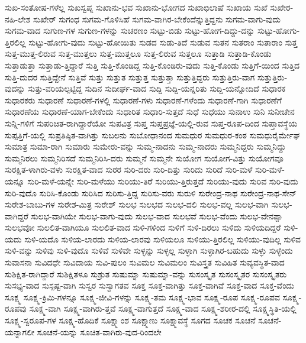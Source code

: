{ಸುಖ-ಸಂತೋಷ-ಗಳೆಲ್ಲ
ಸುಖಸ್ವಪ್ನ
ಸುಖಾನು-ಭವ
ಸುಖಾನು-ಭೋಗದ
ಸುಖಾಭಿಲಾಷೆ
ಸುಖಾಯ
ಸುಖೆ
ಸುಖೇರ-ನಹಿ-ಲೇಶ
ಸುಖೇರ್
ಸುಗಂಧ
ಸುಗಮ-ಗೊಳಿಸಿಹೆ
ಸುಗಮ-ವಾಗಿರ-ಬೇಕೆಂದೆನ್ನುತ್ತಿದ್ದನು
ಸುಗಮ-ವಾಗು-ವುದು
ಸುಗಮ-ವಾದ
ಸುಗುಣ-ಗಳ
ಸುಗುಣ-ಗಳನ್ನು
ಸುಚರಣಂ
ಸುಟ್ಟು-ಬಿಡು
ಸುಟ್ಟು-ಹೋಗ-ದಿದ್ದು-ದನ್ನು
ಸುಟ್ಟು-ಹೋಗು-ತ್ತಿರಲಿಲ್ಲ
ಸುಟ್ಟು-ಹೋಗು-ವುದು
ಸುಟ್ಟು-ಹೋಯಿತು
ಸುಡದ
ಸುಡು-ತಿದೆ
ಸುಡುವ
ಸುತನ
ಸುತರಾಂ
ಸುತಾರಾಂ
ಸುತ್ತ
ಸುತ್ತ-ಮುತ್ತ-ಲಿರುವ
ಸುತ್ತ-ಮುತ್ತಲು
ಸುತ್ತ-ಮುತ್ತಲೂ
ಸುತ್ತ-ಲಿರುವ
ಸುತ್ತಲೂ
ಸುತ್ತಾಡಿ
ಸುತ್ತಾಡಿ-ಕೊಂಡು
ಸುತ್ತಾಡುತ್ತಾ
ಸುತ್ತಾಡು-ತ್ತಿದ್ದಾರೆ
ಸುತ್ತಿ
ಸುತ್ತಿ-ಕೊಂಡಿದ್ದ
ಸುತ್ತಿ-ಕೊಂಡಿರು-ವುದು
ಸುತ್ತಿ-ಕೊಂಡು
ಸುತ್ತಿಗೆ-ಯಿಂದ
ಸುತ್ತಿದ
ಸುತ್ತಿ-ದುದರ
ಸುತ್ತಿದ್ದೇನೆ
ಸುತ್ತಿವೆ
ಸುತ್ತು
ಸುತ್ತುತ
ಸುತ್ತುತ್ತ
ಸುತ್ತುತ್ತಾ
ಸುತ್ತುತ್ತಿದ್ದರು
ಸುತ್ತುತ್ತಿರು-ವಾಗ
ಸುತ್ತುತ್ತಿರು-ವುದನ್ನು
ಸುತ್ತು-ವರಿಯಲ್ಪಟ್ಟಿದ್ದ
ಸುದಿನ
ಸುದೀರ್ಘ-ವಾದ
ಸುದ್ದಿ
ಸುದ್ದಿ-ಯನ್ನರಿತು
ಸುದ್ದಿ-ಯನ್ನೋದಿದೆ
ಸುಧಾರಕ
ಸುಧಾರಕರು
ಸುಧಾರಣೆ
ಸುಧಾರಣೆ-ಗಳಲ್ಲಿ
ಸುಧಾರಣೆ-ಗಳು
ಸುಧಾರಣೆ-ಗಳೆಂದು
ಸುಧಾರಣೆ-ಗಾಗಿ
ಸುಧಾರಣೆಗೆ
ಸುಧಾರಣೆಯ
ಸುಧಾರಣೆ-ಯಾಗ-ಬೇಕೆಂದು
ಸುಧಾರಿತ
ಸುಧಾರಿ-ಸುತ್ತದೆ
ಸುಧೆ
ಸುಧೆಯು
ಸುನಾಉ
ಸುನಿ
ಸುನೀಚೇನ
ಸುನ್ನಿ-ಗಳಿಗೆ
ಸುಪರಿಚಿತ-ರಾಗಿದ್ದಾರೆಯೋ
ಸುಪವಿತ್ರ
ಸುಪ್ತ
ಸುಪ್ತಪ್ರಜ್ಞೆ-ಯಲ್ಲಿ-ರುವ
ಸುಪ್ತ-ರೂಪ-ದಿಂದ
ಸುಪ್ತಾವಸ್ಥೆಯ
ಸುಪ್ಪತ್ತಿಗೆ-ಯಲ್ಲಿ
ಸುಪ್ರತಿಷ್ಠಿತ-ವಾಗಿತ್ತು
ಸುಬಲನು
ಸುಬೋಧಾನಂದ
ಸುಮಧುರ
ಸುಮಧುರ-ಕಂಠ
ಸುಮಧುರೈರ್ಮೇಘ
ಸುಮಾತ್ರ
ಸುಮಾ-ರಾಗಿ
ಸುಮಾರು
ಸುಮೇರು-ವನ್ನು
ಸುಮ್ಮ-ನಾದನು
ಸುಮ್ಮ-ನಾದರು
ಸುಮ್ಮನಿದ್ದರು
ಸುಮ್ಮನಿದ್ದು
ಸುಮ್ಮನಿರಲು
ಸುಮ್ಮನಿರಿಸದೆ
ಸುಮ್ಮನಿರಿಸಿ-ದರು
ಸುಮ್ಮನೆ
ಸುಮ್ಮನೇ
ಸುಯೋಗ
ಸುಯೋಗ-ವಿತ್ತು
ಸುಯೋಗವೂ
ಸುರಕ್ಷಿತ-ಳಾಗಿರು-ವಳು
ಸುರಕ್ಷಿತ-ವಾದ
ಸುರರ
ಸುರಿ-ದರು
ಸುರಿ-ದಿತ್ತು
ಸುರಿದು
ಸುರಿದೆ
ಸುರಿ-ಮಳೆ
ಸುರಿ-ಮಳೆ-ಯನ್ನೂ
ಸುರಿ-ಮಳೆ-ಯನ್ನೇ
ಸುರಿ-ಮಳೆಯು
ಸುರಿಯು-ತಿರೆ
ಸುರಿಯು-ತ್ತಿರುತ್ತದೆ
ಸುರಿಯು-ವುದು
ಸುರಿವ
ಸುರಿ-ವುದು
ಸುರಿ-ವುದೊ
ಸುರಿಸಿ-ಕೊಂಡು
ಸುರಿಸಿದ
ಸುರಿಸು-ತ್ತಿದ್ದ
ಸುರಿಸು-ವರು
ಸುರುಳಿ
ಸುರೇಂದ್ರ-ನಾಥ
ಸುರೇಂದ್ರ-ನಾಥ-ಸೇನ್
ಸುರೇಶ-ಬಾಬು-ಗಳ
ಸುರೇಶ-ಮಿತ್ರ
ಸುರೇಶ್
ಸುಲಭ
ಸುಲಭದ
ಸುಲಭ-ದಲಿ
ಸುಲಭ-ವಲ್ಲ
ಸುಲಭ-ವಾಗಿ
ಸುಲಭ-ವಾಗಿದ್ದರೆ
ಸುಲಭ-ವಾಗಿಯೇ
ಸುಲಭ-ವಾಗು-ವುದು
ಸುಲಭ-ವಾದ
ಸುಲಭವೆ
ಸುಲಭ-ವೆಂದು
ಸುಲಭ-ವೇನಪ್ಪಾ
ಸುಲಭವೋ
ಸುಲಲಿತ-ವಾಗಿಯೂ
ಸುಲಲಿತ-ವಾದ
ಸುಳಿ-ಗಳಿಂದ
ಸುಳಿಗೆ
ಸುಳಿ-ದಿರಲು
ಸುಳಿದು
ಸುಳಿಯದಿದ್ದರೆ
ಸುಳಿ-ಯದು
ಸುಳಿ-ಯದೊ
ಸುಳಿಯ-ಲಾರದು
ಸುಳಿಯ-ಲಾರವು
ಸುಳಿಯಲೂ
ಸುಳಿಯು-ತ್ತಿರಲಿಲ್ಲ
ಸುಳಿಯು-ವುದಿಲ್ಲ
ಸುಳಿವ
ಸುಳಿ-ವನ್ನು
ಸುಳಿವು
ಸುಳಿ-ವುದೊ
ಸುಳಿವೆ
ಸುಳಿವೇ
ಸುಳ್ಳನ್ನು
ಸುಳ್ಳಲ್ಲ
ಸುಳ್ಳಾಗಿ
ಸುಳ್ಳಾಗಿರ-ಬಹುದು
ಸುಳ್ಳು
ಸುಳ್ಳೆಂದು
ಸುವಾಸನಾ
ಸುವಿದಧೇ
ಸುವಿದಾಯ
ಸುವಿ-ಪುಲಂ
ಸುವಿಮಲ
ಸುವಿಮಲಂ
ಸುವಿಸ್ತ್ರತ
ಸುವಿಹಿತ
ಸುವ್ಯವಸ್ಥಿತ-ವಾದ
ಸುಶಿಕ್ಷಿತ-ರಾಗಿದ್ದಾರೆ
ಸುಶಿಕ್ಷಿತಳೂ
ಸುಶ್ರುತ
ಸುಷುಮ್ನಾ
ಸುಷುಮ್ನಾ-ವನ್ನು
ಸುಸಂಸ್ಕೃತ
ಸುಸಂಸ್ಕೃತರ
ಸುಸಂಸ್ಕೃತರು
ಸುಸಭ್ಯ-ವಾದ
ಸುಸ್ಪಷ್ಟ-ವಾಗಿ
ಸುಸ್ವರ
ಸುಸ್ವಾಗತವ
ಸೂಕ್ತ
ಸೂಕ್ತ-ವಾಗಿತ್ತು
ಸೂಕ್ತ-ವಾಗಿವೆ
ಸೂಕ್ತ-ವಾದ
ಸೂಕ್ತ-ವೆಂದು
ಸೂಕ್ಷ್ಮ
ಸೂಕ್ಷ್ಮ-ಕ್ರಿಮಿ-ಗಳನ್ನೂ
ಸೂಕ್ಷ್ಮ-ಜೀವಿ-ಗಳನ್ನು
ಸೂಕ್ಷ್ಮ-ತಮ
ಸೂಕ್ಷ್ಮ-ಭಾವ
ಸೂಕ್ಷ್ಮ-ರೂಪ
ಸೂಕ್ಷ್ಮ-ರೂಪವ
ಸೂಕ್ಷ್ಮ-ರೂಪವು
ಸೂಕ್ಷ್ಮ-ವಾಗಿ
ಸೂಕ್ಷ್ಮ-ವಾಗಿರು-ತ್ತವೆ
ಸೂಕ್ಷ್ಮ-ವಾಗುತ್ತದೆ
ಸೂಕ್ಷ್ಮ-ವಾದ
ಸೂಕ್ಷ್ಮ-ಶರೀರ-ದಲ್ಲಿ
ಸೂಕ್ಷ್ಮಸ್ಥಿತಿ-ಯಲ್ಲಿ
ಸೂಕ್ಷ್ಮ-ಸ್ವರೂಪ-ಗಳ
ಸೂಕ್ಷ್ಮ-ಹೊದಿಕೆ
ಸೂಕ್ಷ್ಮಾಂಶ
ಸೂಕ್ಷ್ಮಾಣು
ಸೂಕ್ಷ್ಮಾವಸ್ಥೆ
ಸೂಗದ
ಸೂಚಕ
ಸೂಚನೆ
ಸೂಚನೆ-ಯನ್ನಾಗಲೀ
ಸೂಚನೆ-ಯನ್ನು
ಸೂಚಿತ-ವಾಗಿರು-ವುದ-ರಿಂದಲೇ
}
